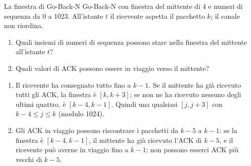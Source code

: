 \begin{esercizio}{La finestra di Go-Back-N}
Go-Back-N con finestra del mittente di 4 e numeri di sequenza da 0 a 1023. All'istante $t$ il ricevente aspetta il pacchetto $k$; il canale
non riordina.
\begin{enumerate}[label=(\alph*)]
    \item Quali insiemi di numeri di sequenza possono stare nella finestra del mittente all'istante $t$?
    \item Quali valori di ACK possono essere in viaggio verso il mittente?
\end{enumerate}

\svolgimento
\begin{enumerate}[label=(\alph*)]
    \item Il ricevente ha consegnato tutto fino a $k-1$. Se il mittente ha già ricevuto tutti gli ACK, la finestra è $[k, k+3]$; se non ne ha
          ricevuto nessuno degli ultimi quattro, è $[k-4, k-1]$. Quindi una qualsiasi $[j, j+3]$ con $k-4 \leq j \leq k$ (modulo 1024).
    \item Gli ACK in viaggio possono riscontrare i pacchetti da $k-5$ a $k-1$: se la finestra è $[k-4, k-1]$, il mittente ha già ricevuto
          l'ACK di $k-5$, e il ricevente può averne in viaggio fino a $k-1$; non possono esserci ACK più vecchi di $k-5$.
\end{enumerate}
\end{esercizio}


